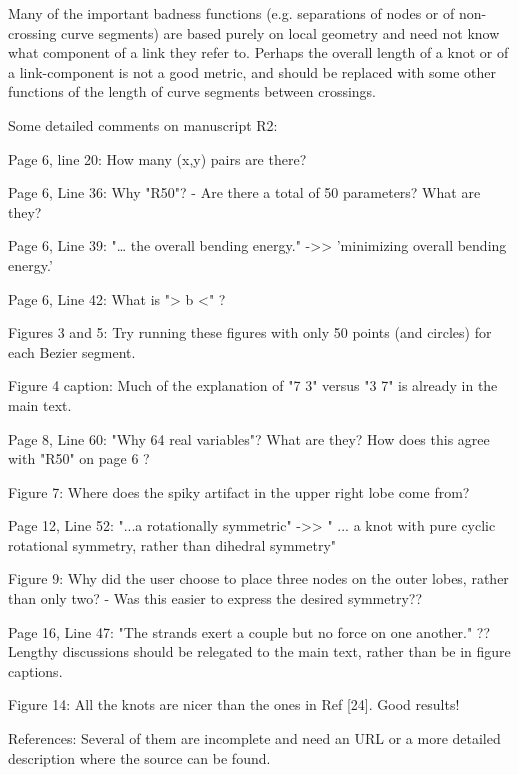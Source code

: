 \documentclass[12pt]{article}
\begin{document}
Many of the important badness functions (e.g. separations of nodes or
of non-crossing curve segments) are based purely on local geometry and
need not know what component of a link they refer to.  Perhaps the
overall length of a knot or of a link-component is not a good metric,
and should be replaced with some other functions of the length of
curve segments between crossings.

Some detailed comments on manuscript R2:

Page 6, line 20:  How many (x,y) pairs are there?

Page 6, Line 36: Why "R50"? - Are there a total of 50 parameters?
What are they?

Page 6, Line 39: "… the overall bending energy." ->> 'minimizing
overall bending energy.'

Page 6, Line 42:  What is "> b <" ?

Figures 3 and 5: Try running these figures with only 50 points (and
circles) for each Bezier segment.

Figure 4 caption: Much of the explanation of "7 3" versus "3 7" is
already in the main text.

Page 8, Line 60: "Why 64 real variables"?  What are they?  How does
this agree with "R50" on page 6 ?

Figure 7:  Where does the spiky artifact in the upper right lobe come from?

Page 12, Line 52: "...a rotationally symmetric" ->> " ... a knot with
pure cyclic rotational symmetry, rather than dihedral symmetry"

Figure 9: Why did the user choose to place three nodes on the outer
lobes, rather than only two? - Was this easier to express the desired
symmetry??

Page 16, Line 47: "The strands exert a couple but no force on one
another." ??  Lengthy discussions should be relegated to the main
text, rather than be in figure captions.

Figure 14: All the knots are nicer than the ones in Ref [24].  Good
results!

References: Several of them are incomplete and need an URL or a more
detailed description where the source can be found.
\end{document}
